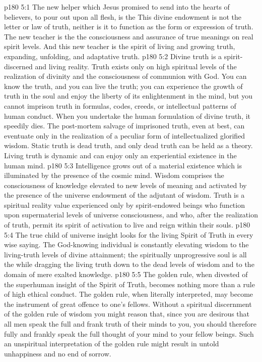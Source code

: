 \vs p180 5:1 The new helper which Jesus promised to send into the hearts of believers, to pour out upon all flesh, is the  This divine endowment is not the letter or law of truth, neither is it to function as the form or expression of truth. The new teacher is the  the consciousness and assurance of true meanings on real spirit levels. And this new teacher is the spirit of living and growing truth, expanding, unfolding, and adaptative truth.
\vs p180 5:2 Divine truth is a spirit\hyp{}discerned and living reality. Truth exists only on high spiritual levels of the realization of divinity and the consciousness of communion with God. You can know the truth, and you can live the truth; you can experience the growth of truth in the soul and enjoy the liberty of its enlightenment in the mind, but you cannot imprison truth in formulas, codes, creeds, or intellectual patterns of human conduct. When you undertake the human formulation of divine truth, it speedily dies. The post\hyp{}mortem salvage of imprisoned truth, even at best, can eventuate only in the realization of a peculiar form of intellectualized glorified wisdom. Static truth is dead truth, and only dead truth can be held as a theory. Living truth is dynamic and can enjoy only an experiential existence in the human mind.
\vs p180 5:3 Intelligence grows out of a material existence which is illuminated by the presence of the cosmic mind. Wisdom comprises the consciousness of knowledge elevated to new levels of meaning and activated by the presence of the universe endowment of the adjutant of wisdom. Truth is a spiritual reality value experienced only by spirit\hyp{}endowed beings who function upon supermaterial levels of universe consciousness, and who, after the realization of truth, permit its spirit of activation to live and reign within their souls.
\vs p180 5:4 The true child of universe insight looks for the living Spirit of Truth in every wise saying. The God\hyp{}knowing individual is constantly elevating wisdom to the living\hyp{}truth levels of divine attainment; the spiritually unprogressive soul is all the while dragging the living truth down to the dead levels of wisdom and to the domain of mere exalted knowledge.
\vs p180 5:5 The golden rule, when divested of the superhuman insight of the Spirit of Truth, becomes nothing more than a rule of high ethical conduct. The golden rule, when literally interpreted, may become the instrument of great offence to one’s fellows. Without a spiritual discernment of the golden rule of wisdom you might reason that, since you are desirous that all men speak the full and frank truth of their minds to you, you should therefore fully and frankly speak the full thought of your mind to your fellow beings. Such an unspiritual interpretation of the golden rule might result in untold unhappiness and no end of sorrow.
